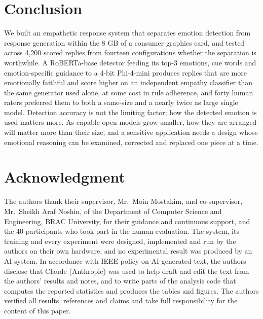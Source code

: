 \documentclass[conference]{IEEEtran}
\begin{document}
\section{Conclusion}\label{sec:conclusion}
We built an empathetic response system that separates emotion detection from response generation within the 8 GB of a consumer graphics card, and tested across 4,200 scored replies from fourteen configurations whether the separation is worthwhile. A RoBERTa-base detector feeding its top-3 emotions, cue words and emotion-specific guidance to a 4-bit Phi-4-mini produces replies that are more emotionally faithful and score higher on an independent empathy classifier than the same generator used alone, at some cost in rule adherence, and forty human raters preferred them to both a same-size and a nearly twice as large single model. Detection accuracy is not the limiting factor; how the detected emotion is used matters more. As capable open models grow smaller, how they are arranged will matter more than their size, and a sensitive application needs a design whose emotional reasoning can be examined, corrected and replaced one piece at a time.

\section*{Acknowledgment}

The authors thank their supervisor, Mr.\ Moin Mostakim, and co-supervisor, Mr.\ Sheikh Araf Noshin, of the Department of Computer Science and Engineering, BRAC University, for their guidance and continuous support, and the 40 participants who took part in the human evaluation. The system, its training and every experiment were designed, implemented and run by the authors on their own hardware, and no experimental result was produced by an AI system. In accordance with IEEE policy on AI-generated text, the authors disclose that Claude (Anthropic) was used to help draft and edit the text from the authors' results and notes, and to write parts of the analysis code that computes the reported statistics and produces the tables and figures. The authors verified all results, references and claims and take full responsibility for the content of this paper.

\end{document}
